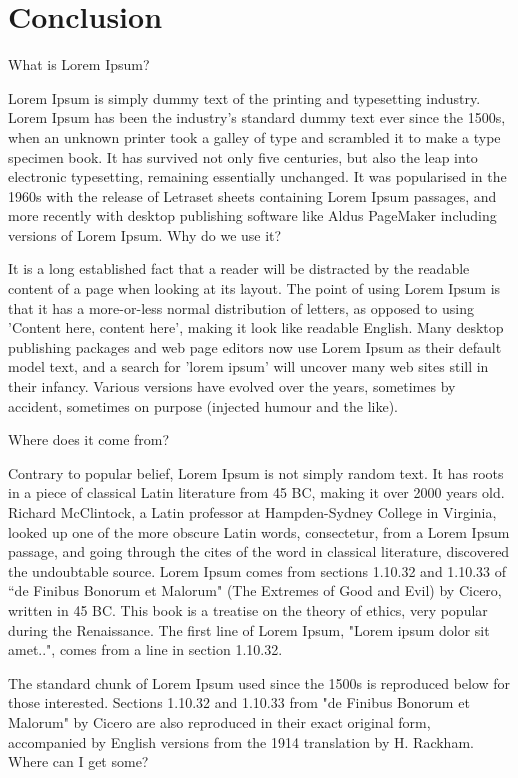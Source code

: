 \newpage
\section{Conclusion}

What is Lorem Ipsum?

Lorem Ipsum is simply dummy text of the printing and typesetting industry. Lorem Ipsum has been the industry's standard dummy text ever since the 1500s, when an unknown printer took a galley of type and scrambled it to make a type specimen book. It has survived not only five centuries, but also the leap into electronic typesetting, remaining essentially unchanged. It was popularised in the 1960s with the release of Letraset sheets containing Lorem Ipsum passages, and more recently with desktop publishing software like Aldus PageMaker including versions of Lorem Ipsum.
Why do we use it?

It is a long established fact that a reader will be distracted by the readable content of a page when looking at its layout. The point of using Lorem Ipsum is that it has a more-or-less normal distribution of letters, as opposed to using 'Content here, content here', making it look like readable English. Many desktop publishing packages and web page editors now use Lorem Ipsum as their default model text, and a search for 'lorem ipsum' will uncover many web sites still in their infancy. Various versions have evolved over the years, sometimes by accident, sometimes on purpose (injected humour and the like).

Where does it come from?

Contrary to popular belief, Lorem Ipsum is not simply random text. It has roots in a piece of classical Latin literature from 45 BC, making it over 2000 years old. Richard McClintock, a Latin professor at Hampden-Sydney College in Virginia, looked up one of the more obscure Latin words, consectetur, from a Lorem Ipsum passage, and going through the cites of the word in classical literature, discovered the undoubtable source. Lorem Ipsum comes from sections 1.10.32 and 1.10.33 of ``de Finibus Bonorum et Malorum" (The Extremes of Good and Evil) by Cicero, written in 45 BC. This book is a treatise on the theory of ethics, very popular during the Renaissance. The first line of Lorem Ipsum, "Lorem ipsum dolor sit amet..", comes from a line in section 1.10.32.

The standard chunk of Lorem Ipsum used since the 1500s is reproduced below for those interested. Sections 1.10.32 and 1.10.33 from "de Finibus Bonorum et Malorum" by Cicero are also reproduced in their exact original form, accompanied by English versions from the 1914 translation by H. Rackham.
Where can I get some?

